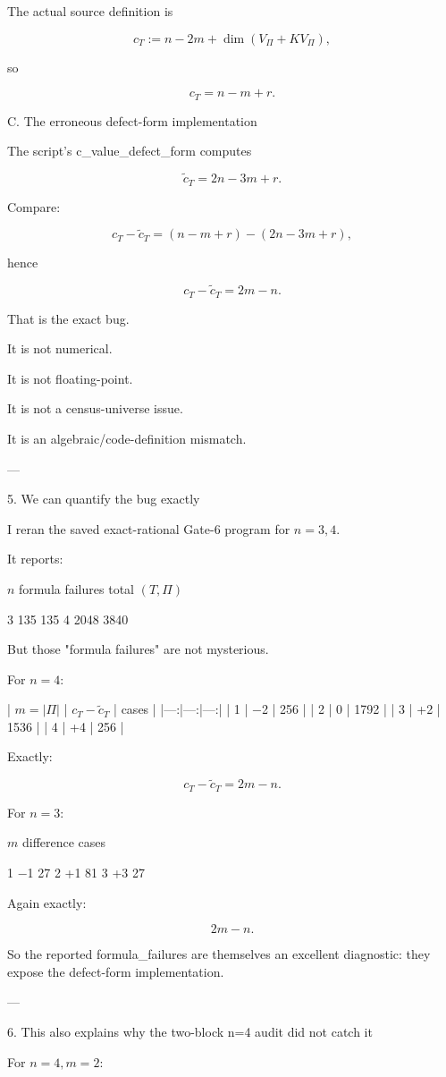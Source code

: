 The actual source definition is

\[
c_T
:=
n-2m+\dim(V_\Pi+KV_\Pi),
\]

so

\[
\boxed{
c_T=n-m+r.
}
\]

C. The erroneous defect-form implementation

The script's c_value_defect_form computes

\[
\widetilde c_T
=
2n-3m+r.
\]

Compare:

\[
c_T-\widetilde c_T
=
(n-m+r)-(2n-3m+r),
\]

hence

\[
\boxed{
c_T-\widetilde c_T=2m-n.
}
\]

That is the exact bug.

It is not numerical.

It is not floating-point.

It is not a census-universe issue.

It is an algebraic/code-definition mismatch.


---

5. We can quantify the bug exactly

I reran the saved exact-rational Gate-6 program for \(n=3,4\).

It reports:

\(n\)	formula failures	total \((T,\Pi)\)

3	135	135
4	2048	3840


But those "formula failures" are not mysterious.

For \(n=4\):

| \(m=|\Pi|\) | \(c_T-\widetilde c_T\) | cases | |---:|---:|---:| | 1 | −2 | 256 | | 2 | 0 | 1792 | | 3 | +2 | 1536 | | 4 | +4 | 256 |

Exactly:

\[
c_T-\widetilde c_T=2m-n.
\]

For \(n=3\):

\(m\)	difference	cases

1	−1	27
2	+1	81
3	+3	27


Again exactly:

\[
2m-n.
\]

So the reported formula_failures are themselves an excellent diagnostic: they expose the defect-form implementation.


---

6. This also explains why the two-block n=4 audit did not catch it

For \(n=4,m=2\):

